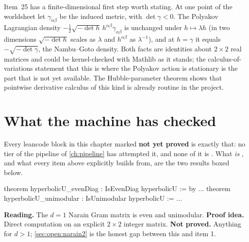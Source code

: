 Item~25 has a finite-dimensional first step worth stating. At one point of the worldsheet let
$\gamma_{\alpha\beta}$ be the induced metric, with $\det\gamma<0$. The Polyakov Lagrangian density
$-\tfrac12\sqrt{-\det h}\,h^{\alpha\beta}\gamma_{\alpha\beta}$ is unchanged under $h\mapsto\lambda h$
(in two dimensions $\sqrt{-\det h}$ scales as $\lambda$ and $h^{\alpha\beta}$ as $\lambda^{-1}$), and at
$h=\gamma$ it equals $-\sqrt{-\det\gamma}$, the Nambu--Goto density. Both facts are identities about
$2\times2$ real matrices and could be kernel-checked with Mathlib as it stands; the calculus-of-variations
statement that this is where the Polyakov action is stationary is the part that is not yet available.
The Hubble-parameter theorem \allowbreak{}\allowbreak{} shows that
pointwise derivative calculus of this kind is already routine in the project.

\section{What the machine has checked}\label{sec:open:lean}

Every leancode block in this chapter marked \textbf{not yet proved} is exactly that: no
tier of the pipeline of \cref{ch:pipeline} has attempted it, and none of it is \TA. What
\emph{is} \TA, and what every item above explicitly builds from, are the two results
boxed below.

\begin{leanbox}
\begin{leancode}
theorem hyperbolicU_evenDiag : IsEvenDiag hyperbolicU := by ...
theorem hyperbolicU_unimodular : IsUnimodular hyperbolicU := ...
\end{leancode}
\textbf{Reading.} The $d=1$ Narain Gram matrix is even and unimodular.
\textbf{Proof idea.} Direct computation on an explicit $2\times2$ integer matrix.
\textbf{Not proved.} Anything for $d>1$; \cref{sec:open:narain2} is the honest gap between
this and item 1. \TA
\end{leanbox}

